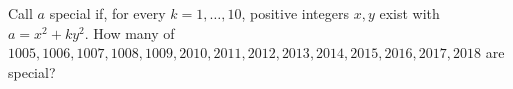 Call $a$ special if, for every $k=1,\ldots,10$, positive integers $x,y$ exist with $a=x^2+ky^2$. How many of $1005,1006,1007,1008,1009,2010,2011,2012,2013,2014,2015,2016,2017,2018$ are special?
